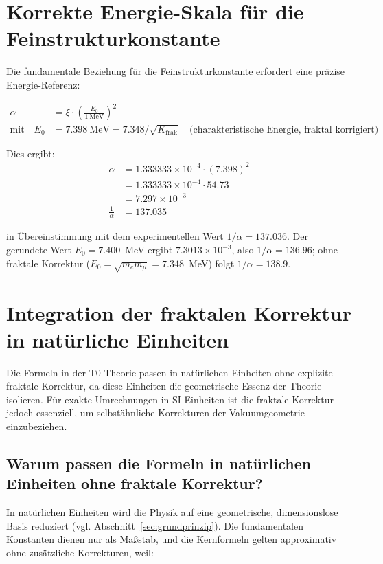 	\section{Korrekte Energie-Skala für die Feinstrukturkonstante}
	
	Die fundamentale Beziehung für die Feinstrukturkonstante erfordert eine präzise Energie-Referenz:
	
	\begin{align}
		\alpha &= \xi \cdot \left( \frac{E_0}{1~\mathrm{MeV}} \right)^2 \\
		\text{mit} \quad E_0 &= 7.398~\mathrm{MeV} = 7.348/\sqrt{K_{\text{frak}}} \quad \text{(charakteristische Energie, fraktal korrigiert)}
	\end{align}
	
	Dies ergibt:
	\begin{align}
		\alpha &= 1.333333 \times 10^{-4} \cdot (7.398)^2 \\
		&= 1.333333 \times 10^{-4} \cdot 54.73 \\
		&= 7.297 \times 10^{-3} \\
		\frac{1}{\alpha} &= 137.035
	\end{align}
	
	in Übereinstimmung mit dem experimentellen Wert $1/\alpha = 137.036$. Der gerundete Wert $E_0 = 7.400$~MeV ergibt $7.3013 \times 10^{-3}$, also $1/\alpha = 136.96$; ohne fraktale Korrektur ($E_0 = \sqrt{m_e m_\mu} = 7.348$~MeV) folgt $1/\alpha = 138.9$.
	
	\section{Integration der fraktalen Korrektur in natürliche Einheiten}
	
	Die Formeln in der T0-Theorie passen in natürlichen Einheiten ohne explizite fraktale Korrektur, da diese Einheiten die geometrische Essenz der Theorie isolieren. Für exakte Umrechnungen in SI-Einheiten ist die fraktale Korrektur jedoch essenziell, um selbstähnliche Korrekturen der Vakuumgeometrie einzubeziehen.
	
	\subsection{Warum passen die Formeln in natürlichen Einheiten ohne fraktale Korrektur?}
	
	In natürlichen Einheiten wird die Physik auf eine geometrische, dimensionslose Basis reduziert (vgl. Abschnitt~\ref{sec:grundprinzip}). Die fundamentalen Konstanten dienen nur als Maßstab, und die Kernformeln gelten approximativ ohne zusätzliche Korrekturen, weil:
	
